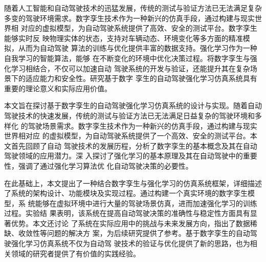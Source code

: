 \begin{abstractzh}

随着人工智能和自动驾驶技术的迅猛发展，传统的测试与验证方法已无法满足复杂
多变的驾驶环境需求。数字孪生技术作为一种新兴的仿真手段，通过构建与现实世界相
对应的虚拟模型，为自动驾驶系统提供了高效、安全的测试平台。数字孪生能够实时反
映物理实体的状态，支持对车辆动态、环境变化等多方面的精准模拟，从而为自动驾驶
算法的训练与优化提供丰富的数据支持。强化学习作为一种自我学习的智能算法，能够
在不断变化的环境中优化决策过程。将数字孪生与强化学习相结合，不仅可以加速自动
驾驶系统的开发与验证，还能提升其在复杂场景下的适应能力和安全性。研究基于数字
孪生的自动驾驶强化学习仿真系统具有重要的理论意义和实际应用价值。

本文旨在探讨基于数字孪生的自动驾驶强化学习仿真系统的设计与实现。随着自动
驾驶技术的快速发展，传统的测试与验证方法已无法满足日益复杂的驾驶环境和多样化
的驾驶场景需求。数字孪生技术作为一种新兴的仿真手段，通过构建与现实世界相对应
的虚拟模型，为自动驾驶系统提供了一个高效、安全的测试平台。本文首先回顾了自动
驾驶技术的发展历程，分析了数字孪生的基本概念及其在自动驾驶领域的应用潜力。深
入探讨了强化学习的基本原理及其在自动驾驶中的重要性，强调了通过强化学习算法优
化自动驾驶决策的必要性。

在此基础上，本文提出了一种结合数字孪生与强化学习的仿真系统框架，详细描述
了系统的架构设计、功能模块及实现过程。通过构建一个真实环境的数字孪生模型，系
统能够在虚拟环境中进行大量的驾驶场景仿真，进而加速强化学习的训练过程。实验结
果表明，该系统在提高自动驾驶决策的准确性与稳定性方面具有显著优势。本文还讨论
了系统在实际应用中的挑战与未来发展方向，指出了数据稀缺、收敛性等问题的解决方
案，为后续研究提供了参考。基于数字孪生的自动驾驶强化学习仿真系统不仅为自动驾
驶技术的验证与优化提供了新的思路，也为相关领域的研究者提供了有价值的实践经验。

\end{abstractzh}